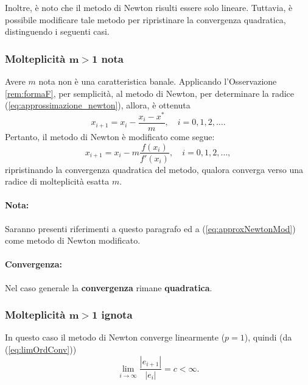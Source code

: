 Inoltre, è noto che il metodo di Newton risulti essere solo lineare. Tuttavia, è possibile modificare tale metodo per ripristinare la convergenza quadratica, distinguendo i seguenti casi.

\subsubsection{Molteplicità \texorpdfstring{$\boldsymbol{m>1}$}{m>1} nota}
Avere $m$ nota non è una caratteristica banale. Applicando l'Osservazione \ref{rem:formaF}, per semplicità, al metodo di Newton, per determinare la radice (\ref{eq:approssimazione_newton}), allora, è ottenuta
\begin{equation*}
	x_{i+1}=x_i-\frac{x_i-x^*}{m}, \quad i=0,1,2,\hdots.
\end{equation*}
Pertanto, il metodo di Newton è modificato come segue:
\begin{equation}\label{eq:approxNewtonMod}
	x_{i+1}=x_i-m\frac{f(x_i)}{f'(x_i)}, \quad i=0,1,2,\hdots,
\end{equation}
ripristinando la convergenza quadratica del metodo, qualora converga verso una radice di molteplicità esatta $m$.

\paragraph{Nota:} Saranno presenti riferimenti a questo paragrafo ed a (\ref{eq:approxNewtonMod}) come metodo di Newton modificato.

\paragraph{Convergenza:} Nel caso generale la \textbf{convergenza} rimane \textbf{quadratica}.

\subsubsection{Molteplicità \texorpdfstring{$\boldsymbol{m>1}$}{m>1} ignota}
In questo caso il metodo di Newton converge linearmente ($p=1$), quindi (da (\ref{eq:limOrdConv}))
\begin{equation*}
	\underset{i\to\infty}{\lim}{\frac{|e_{i+1}|}{|e_i|}} = c<\infty.
\end{equation*}

